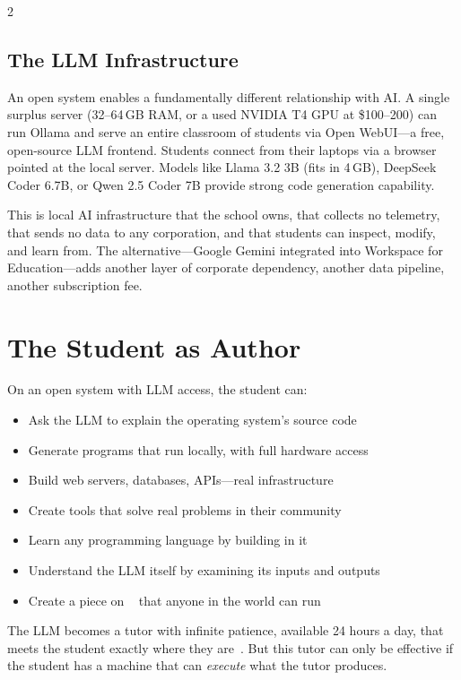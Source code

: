 \documentclass[11pt, a4paper]{article}
\begin{document}
\begin{multicols}{2}
\subsection{The LLM Infrastructure}

An open system enables a fundamentally different relationship with AI. A single surplus server (32--64\,GB RAM, or a used NVIDIA T4 GPU at \$100--200) can run Ollama and serve an entire classroom of students via Open WebUI---a free, open-source LLM frontend. Students connect from their laptops via a browser pointed at the local server. Models like Llama 3.2 3B (fits in 4\,GB), DeepSeek Coder 6.7B, or Qwen 2.5 Coder 7B provide strong code generation capability.

This is local AI infrastructure that the school owns, that collects no telemetry, that sends no data to any corporation, and that students can inspect, modify, and learn from. The alternative---Google Gemini integrated into Workspace for Education---adds another layer of corporate dependency, another data pipeline, another subscription fee.


\section{The Student as Author}

On an open system with LLM access, the student can:

\begin{itemize}
  \item Ask the LLM to explain the operating system's source code
  \item Generate programs that run locally, with full hardware access
  \item Build web servers, databases, APIs---real infrastructure
  \item Create tools that solve real problems in their community
  \item Learn any programming language by building in it
  \item Understand the LLM itself by examining its inputs and outputs
  \item Create a piece on \ac{}~\citep{scudder2026ac} that anyone in the world can run
\end{itemize}

The LLM becomes a tutor with infinite patience, available 24 hours a day, that meets the student exactly where they are~\citep{khan2024bravenew}. But this tutor can only be effective if the student has a machine that can \emph{execute} what the tutor produces.


\end{multicols}
\end{document}
